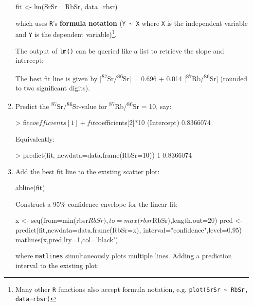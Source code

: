 \begin{enumerate}
\begin{script}
fit <- lm(SrSr ~ RbSr, data=rbsr)
\end{script}

\noindent which uses \texttt{R}'s \textbf{formula notation}
(\verb|Y ~ X| where \texttt{X} is the independent variable and
\texttt{Y} is the dependent variable)\footnote{Many other \texttt{R}
  functions also accept formula notation, e.g. \texttt{plot(SrSr
    \textasciitilde{} RbSr, data=rbsr)}}.

The output of \texttt{lm()} can be queried like a list to retrieve the
slope and intercept:


The best fit line is given by
[\textsuperscript{87}Sr/\textsuperscript{86}Sr] = 0.696 + 0.014
[\textsuperscript{87}Rb/\textsuperscript{86}Sr] (rounded to two
significant digits).

\item Predict the \textsuperscript{87}Sr/\textsuperscript{86}Sr-value
  for \textsuperscript{87}Rb/\textsuperscript{86}Sr = 10, say:
  
\begin{console}
> fit$coefficients[1] + fit$coefficients[2]*10
(Intercept)
  0.8366074 
\end{console}

Equivalently:

\begin{console}
> predict(fit, newdata=data.frame(RbSr=10))
        1 
0.8366074
\end{console}

\item Add the best fit line to the existing scatter plot:

\begin{script}[firstnumber=2]
abline(fit)
\end{script}

Construct a 95\% confidence envelope for the linear fit:

\begin{script}[firstnumber=3]
x <- seq(from=min(rbsr$RbSr),to=max(rbsr$RbSr),length.out=20)
pred <- predict(fit,newdata=data.frame(RbSr=x),
                interval="confidence",level=0.95)
matlines(x,pred,lty=1,col='black')
\end{script}

\noindent where \texttt{matlines} simultaneously plots multiple lines.
Adding a prediction interval to the existing plot:


\end{enumerate}

